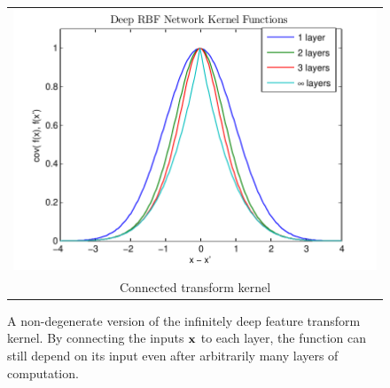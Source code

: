\documentclass[twoside]{article}
\begin{document}
\begin{figure}[h]
\centering
\begin{tabular}{c}
\hspace{-0.5cm}\includegraphics[width=\columnwidth, clip, trim = 0cm 0cm 1cm 0.61cm]{figures/deep_kernel_connected} \\
Connected transform kernel
\end{tabular}
\caption{
A non-degenerate version of the infinitely deep feature transform kernel.  By connecting the inputs ${\bf{x}}$ to each layer, the function can still depend on its input even after arbitrarily many layers of computation.}
\label{fig:deep_kernel_connected}
\end{figure}
\end{document}
